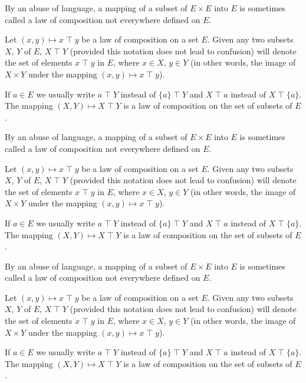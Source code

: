 \documentclass[twoside,usebookdim]{bourbaki}
\begin{document}
By an abuse of language, a mapping of a subset of $E\times E$ into $E$
is sometimes called a law of composition not everywhere defined on $E$.

Let $(x,y)\mapsto x\mathbin{\top} y$ be a law of composition on a set $E$. Given
any two subsets $X$, $Y$ of $E$, $X \mathbin{\top} Y$ (provided this notation does
not lead to confusion) will denote the set of elements $x\mathbin{\top} y$ in $E$,
where $x\in X$, $y\in Y$ (in other words, the image of $X\times Y$ under
the mapping $(x,y)\mapsto x\mathbin{\top} y$).

If $a\in E$ we usually write $a\mathbin{\top} Y$ instead of $\{a\}\mathbin{\top} Y$ and
$X\mathbin{\top} a$ instead of $X\mathbin{\top}\{a\}$. The mapping $(X, Y)\mapsto X\mathbin{\top} Y$
is a law of composition on the set of subsets of $E$.

By an abuse of language, a mapping of a subset of $E\times E$ into $E$
is sometimes called a law of composition not everywhere defined on $E$.

Let $(x,y)\mapsto x\mathbin{\top} y$ be a law of composition on a set $E$. Given
any two subsets $X$, $Y$ of $E$, $X \mathbin{\top} Y$ (provided this notation does
not lead to confusion) will denote the set of elements $x\mathbin{\top} y$ in $E$,
where $x\in X$, $y\in Y$ (in other words, the image of $X\times Y$ under
the mapping $(x,y)\mapsto x\mathbin{\top} y$).

If $a\in E$ we usually write $a\mathbin{\top} Y$ instead of $\{a\}\mathbin{\top} Y$ and
$X\mathbin{\top} a$ instead of $X\mathbin{\top}\{a\}$. The mapping $(X, Y)\mapsto X\mathbin{\top} Y$
is a law of composition on the set of subsets of $E$.


By an abuse of language, a mapping of a subset of $E\times E$ into $E$
is sometimes called a law of composition not everywhere defined on $E$.

Let $(x,y)\mapsto x\mathbin{\top} y$ be a law of composition on a set $E$. Given
any two subsets $X$, $Y$ of $E$, $X \mathbin{\top} Y$ (provided this notation does
not lead to confusion) will denote the set of elements $x\mathbin{\top} y$ in $E$,
where $x\in X$, $y\in Y$ (in other words, the image of $X\times Y$ under
the mapping $(x,y)\mapsto x\mathbin{\top} y$).

If $a\in E$ we usually write $a\mathbin{\top} Y$ instead of $\{a\}\mathbin{\top} Y$ and
$X\mathbin{\top} a$ instead of $X\mathbin{\top}\{a\}$. The mapping $(X, Y)\mapsto X\mathbin{\top} Y$
is a law of composition on the set of subsets of $E$.
\end{document}
